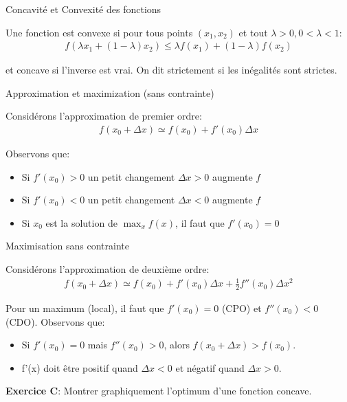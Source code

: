 \documentclass[handout]{beamer}
\begin{document}
\begin{frame}{Concavité et Convexité des fonctions}

Une fonction est convexe si pour tous points $(x_1,x_2)$ et tout $\lambda>0,0<\lambda<1$: 
\begin{align*}
f(\lambda x_1 + (1-\lambda) x_2) \leq \lambda f(x_1) + (1-\lambda)f(x_2)
\end{align*}

et concave si l'inverse est vrai. On dit strictement si les inégalités sont strictes. 

\end{frame}



\begin{frame}{Approximation et maximization (sans contrainte)}

Considérons l'approximation de premier ordre:
\begin{eqnarray}
 f(x_0+\Delta x) \simeq f(x_0)+ f'(x_0)\Delta x 
\end{eqnarray}

Observons que:
\begin{itemize}
\item Si $f'(x_0)>0$  un petit changement $\Delta x>0$ augmente $f$
\item Si $f'(x_0) <0$ un petit changement $\Delta x <0$ augmente $f$
\item Si $x_0$  est la solution de  $\max_x f(x)$, il faut que $f'(x_0) =0$
\end{itemize} 
\end{frame}

\begin{frame}{Maximisation sans contrainte}

Considérons l'approximation de deuxième ordre:
\begin{eqnarray}
 f(x_0+\Delta x) \simeq f(x_0) + f'(x_0)\Delta x +\frac{1}{2}f''(x_0)\Delta x ^2  
\end{eqnarray}

Pour un maximum (local), il faut que $f'(x_0)=0$ (CPO) et $f''(x_0)<0$ (CDO). 
Observons que:
\begin{itemize}
\item Si $f'(x_0) = 0$ mais $f''(x_0)>0$, alors $f(x_0+\Delta x) > f(x_0)$. 
\item f'(x) doit être positif quand $\Delta x <0$ et négatif quand $\Delta x>0$. 
\end{itemize}

\textbf{Exercice C}: Montrer graphiquement l'optimum d'une fonction concave.
\end{frame}
\end{document}

